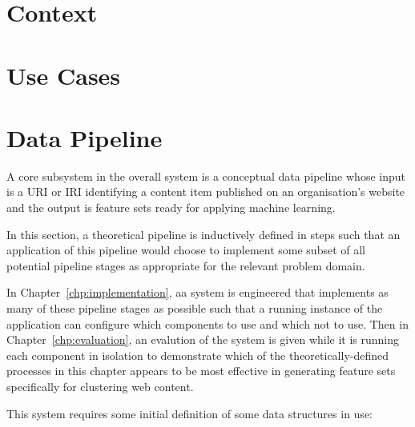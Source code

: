 \documentclass[10pt,a4paper]{report}
\begin{document}
\section{Context}

\section{Use Cases}

\section{Data Pipeline}

A core subsystem in the overall system is a conceptual data pipeline whose
input is a URI or IRI identifying a content item published on an organisation's
website and the output is feature sets ready for applying machine learning.

In this section, a theoretical pipeline is inductively defined in steps such
that an application of this pipeline would choose to implement some subset of
all potential pipeline stages as appropriate for the relevant problem domain.

In Chapter~\ref{chp:implementation}, aa system is engineered that implements
as many of these pipeline stages as possible such that a running instance of
the application can configure which components to use and which not to use.
Then in Chapter~\ref{chp:evaluation}, an evalution of the system is given
while it is running each component in isolation to demonstrate which of the
theoretically-defined processes in this chapter appears to be most effective
in generating feature sets specifically for clustering web content.

This system requires some initial definition of some data structures in use:
\end{document}
